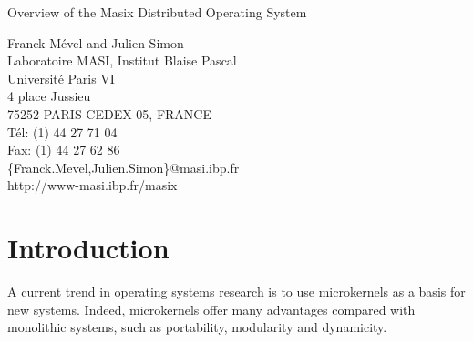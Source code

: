 

\parskip=2mm



\begin{center}
{\Large Overview of the Masix Distributed Operating System}

Franck M\'evel and Julien Simon\\
Laboratoire MASI, Institut Blaise Pascal\\ 
Universit\'e Paris VI\\
4 place Jussieu\\
75252 PARIS CEDEX 05, FRANCE\\
T\'el: (1) 44 27 71 04\\
Fax: (1) 44 27 62 86\\
\{Franck.Mevel,Julien.Simon\}@masi.ibp.fr\\
http://www-masi.ibp.fr/masix

\end{center}

\newcommand {\figps} [4]
{
    \begin{figure} [ht] 
       \begin{center} 
                \leavevmode
                \epsfxsize=#2
                \epsfysize=#3
                \epsffile {#1.ps}
                \caption {#4}
                \label {fig:#1}
        \end{center}
    \end{figure} 
}       

\newcommand {\mysection} [1]
{
        \vspace {-5mm}
        \section {#1}
        \vspace {-3mm}
}

\newcommand {\mysubsection} [1]
{
        \vspace {-1mm}
        \subsection {#1}
        \vspace {-3mm}
}

\newcommand {\myitem}
{
        \vspace {-2mm}
        \item
}


\mysection {Introduction}

A current trend in operating systems research is to use microkernels as a basis
for new systems. 
Indeed, microkernels offer many advantages compared with monolithic systems, 
such as portability, modularity and dynamicity.

